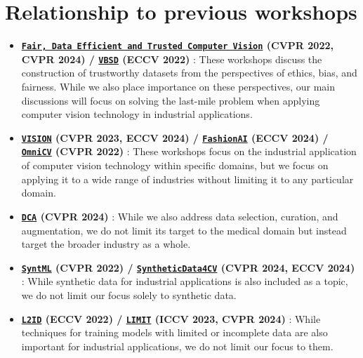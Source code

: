 \documentclass{article}
\def\c#1{\textcolor{gray}{#1}}
\begin{document}
\section{Relationship to previous workshops}

\begin{itemize}
    \item
    { \bf
        \href{https://fadetrcv.github.io/2024/}{\texttt{Fair, Data Efficient and Trusted Computer Vision}} (CVPR 2022, CVPR 2024) / 
        \href{https://wvbsd.github.io/2022/index.html}{\texttt{VBSD}} (ECCV 2022)
    }:
    These workshops discuss the construction of trustworthy datasets from the perspectives of ethics, bias, and fairness. While we also place importance on these perspectives, our main discussions will focus on solving the last-mile problem when applying computer vision technology in industrial applications.

    \item
    { \bf
        \href{https://vision-based-industrial-inspection.github.io/eccv-24}{\texttt{VISION}} (CVPR 2023, ECCV 2024) / 
        \href{https://sites.google.com/view/fashionai2024}{\texttt{FashionAI}} (ECCV 2024) /
        \href{https://sites.google.com/view/omnicv2022}{\texttt{OmniCV}} (CVPR 2022)
    }:
    These workshops focus on the industrial application of computer vision technology within specific domains, but we focus on applying it to a wide range of industries without limiting it to any particular domain.

    \item
    { \bf
        \href{https://dca-in-mi.github.io/}{\texttt{DCA}} (CVPR 2024)
    }:
    While we also address data selection, curation, and augmentation, we do not limit its target to the medical domain but instead target the broader industry as a whole.

    \item
    {\bf
        \href{https://syntml-cvpr2022-workshop.github.io/}{\texttt{SyntML}} (CVPR 2022) /
        \href{https://syntheticdata4cv.wordpress.com/}{\texttt{SyntheticData4CV}} (CVPR 2024, ECCV 2024)
    }:
    While synthetic data for industrial applications is also included as a topic, we do not limit our focus solely to synthetic data.

    \item
    {\bf
        \href{https://l2id.github.io/l2id2022/}{\texttt{L2ID}} (ECCV 2022) / 
        \href{https://hirokatsukataoka16.github.io/CVPR-2024-LIMIT}{\texttt{LIMIT}} (ICCV 2023, CVPR 2024)
    }:
    While techniques for training models with limited or incomplete data are also important for industrial applications, we do not limit our focus to them.


\end{itemize}
\end{document}
